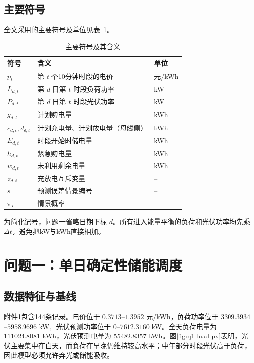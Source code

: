 \documentclass[UTF8,12pt,a4paper]{ctexart}
\begin{document}
\subsection{主要符号}

全文采用的主要符号及单位见表~\ref{tab:symbols}。

\begin{table}[H]
\centering
\caption{主要符号及其含义}
\label{tab:symbols}
\begin{tabular}{>{\centering\arraybackslash}p{2.2cm}p{8.8cm}p{2.2cm}}
\toprule
符号 & 含义 & 单位\\
\midrule
$p_t$ & 第 $t$ 个10分钟时段的电价 & 元/kWh\\
$L_{d,t}$ & 第 $d$ 日第 $t$ 时段负荷功率 & kW\\
$P_{d,t}$ & 第 $d$ 日第 $t$ 时段光伏功率 & kW\\
$g_{d,t}$ & 计划购电量 & kWh\\
$c_{d,t},d_{d,t}$ & 计划充电量、计划放电量（母线侧） & kWh\\
$E_{d,t}$ & 时段开始时储电量 & kWh\\
$h_{d,t}$ & 紧急购电量 & kWh\\
$w_{d,t}$ & 未利用剩余电量 & kWh\\
$z_{d,t}$ & 充放电互斥变量 & --\\
$s$ & 预测误差情景编号 & --\\
$\pi_s$ & 情景概率 & --\\
\bottomrule
\end{tabular}
\end{table}

为简化记号，问题一省略日期下标 $d$。所有进入能量平衡的负荷和光伏功率均先乘 $\Delta t$，避免把kW与kWh直接相加。

\section{问题一：单日确定性储能调度}

\subsection{数据特征与基线}

附件1包含144条记录。电价位于 $0.3713$--$1.3952$ 元/kWh，负荷功率位于 $3309.3934$--$5958.9696$ kW，光伏预测功率位于 $0$--$7612.3160$ kW。全天负荷电量为 $111024.8081$ kWh，光伏预测电量为 $55482.8357$ kWh。图\ref{fig:q1-load-pv}表明，光伏主要集中在白天，而负荷在早晚仍维持较高水平；中午部分时段光伏高于负荷，因此模型必须允许弃光或储能吸收。
\end{document}
